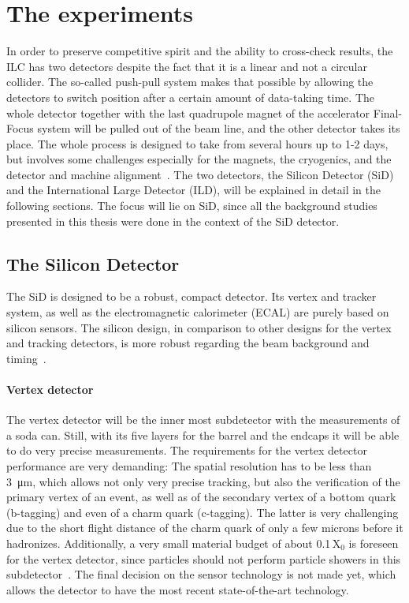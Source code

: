 
\newpage
\section{The experiments}
\label{ILC:detectors}
In order to preserve competitive spirit and the ability to cross-check results, the ILC has two detectors despite the fact that it is a linear and not a circular collider.
The so-called push-pull system makes that possible by allowing the detectors to switch position after a certain amount of data-taking time.
The whole detector together with the last quadrupole magnet of the accelerator Final-Focus system will be pulled out of the beam line, and the other detector takes its place.
The whole process is designed to take from several hours up to 1-2 days, but involves some challenges especially for the magnets, the cryogenics, and the detector and machine alignment~\cite[p. 28-29]{TDR1}.
The two detectors, the Silicon Detector (SiD) and the International Large Detector (ILD), will be explained in detail in the following sections.
The focus will lie on SiD, since all the background studies presented in this thesis were done in the context of the SiD detector.

\subsection{The Silicon Detector}
The SiD is designed to be a robust, compact detector.
Its vertex and tracker system, as well as the electromagnetic calorimeter (ECAL) are purely based on silicon sensors.
The silicon design, in comparison to other designs for the vertex and tracking detectors, is more robust regarding the beam background and timing~\cite[cf. p. 57ff]{TDR4}.
\paragraph{Vertex detector}
The vertex detector will be the inner most subdetector with the measurements of a soda can.
Still, with its five layers for the barrel and the endcaps it will be able to do very precise measurements.
The requirements for the vertex detector performance are very demanding:
The spatial resolution has to be less than \SI{3}{\micro\meter}, which allows not only very precise tracking, but also the verification of the primary vertex of an event, as well as of the secondary vertex of a bottom quark (b-tagging) and even of a charm quark (c-tagging).
The latter is very challenging due to the short flight distance of the charm quark of only a few microns before it hadronizes.
Additionally, a very small material budget of about 0.1\,X$_0$ is foreseen for the vertex detector, since particles should not perform particle showers in this subdetector~\cite{SiD_Update}.
The final decision on the sensor technology is not made yet, which allows the detector to have the most recent state-of-the-art technology.
